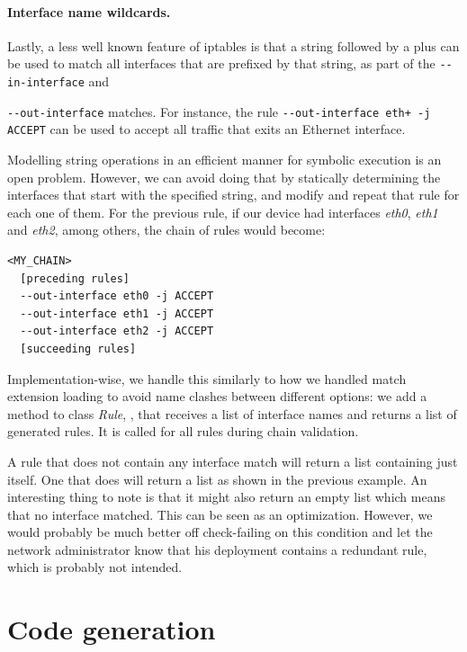 \paragraph{Interface name wildcards.}
Lastly, a less well known feature of iptables is that a string followed by a
plus can be used to match all interfaces that are prefixed by that string, as
part of the \lstinline{--in-interface} and {\lstinline{--out-interface}
matches.  For instance, the rule \lstinline{--out-interface eth+ -j ACCEPT} can
be used to accept all traffic that exits an Ethernet interface.

Modelling string operations in an efficient manner for symbolic execution is an
open problem.  However, we can avoid doing that by statically determining the
interfaces that start with the specified string, and modify and repeat that
rule for each one of them.  For the previous rule, if our device had
interfaces \emph{eth0}, \emph{eth1} and \emph{eth2}, among others, the chain of
rules would become:

\begin{listing}
  \lstset{numbers=none, frame=single, basicstyle=\ttfamily,
    xleftmargin=0.25\textwidth, xrightmargin=0.25\textwidth
  }
  \small
  \begin{lstlisting}
<MY_CHAIN>
  [preceding rules]
  --out-interface eth0 -j ACCEPT
  --out-interface eth1 -j ACCEPT
  --out-interface eth2 -j ACCEPT
  [succeeding rules]
  \end{lstlisting}
\end{listing}

Implementation-wise, we handle this similarly to how we handled match extension
loading to avoid name clashes between different options: we add a method to
class \emph{Rule}, , that
receives a list of interface names and returns a list of generated rules.  It
is called for all rules during chain validation.

A rule that does not contain any interface match will return a list containing
just itself.  One that does will return a list as shown in the previous
example.  An interesting thing to note is that it might also return an empty
list which means that no interface matched.  This can be seen as an
optimization.  However, we would probably be much better off check-failing on
this condition and let the network administrator know that his deployment
contains a redundant rule, which is probably not intended.


\section{Code generation}\label{sec:codegen}

}
